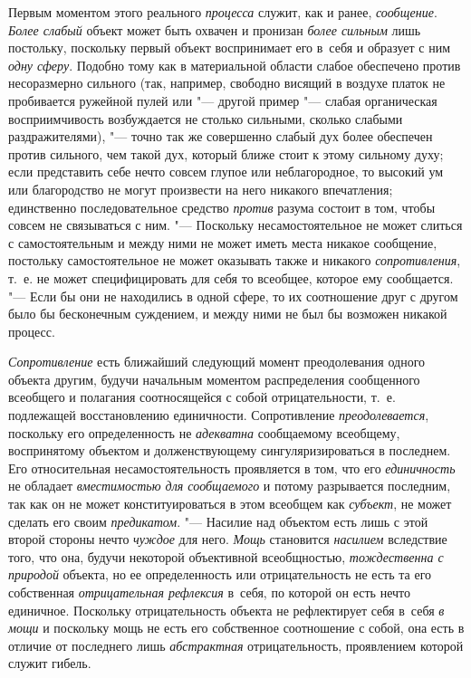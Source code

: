 Первым моментом этого реального
{\em процесса} служит,
как и ранее, {\em сообщение}.
{\em Более слабый} объект
может быть охвачен и пронизан {\em более
сильным} лишь постольку, поскольку первый объект
воспринимает его в~себя и образует с ним
{\em одну сферу}. Подобно
тому как в материальной области слабое обеспечено против несоразмерно
сильного (так, например, свободно висящий в воздухе платок не пробивается
ружейной пулей или "--- другой пример "--- слабая
органическая восприимчивость возбуждается не столько сильными, сколько
слабыми раздражителями), "--- точно так же совершенно слабый
дух более обеспечен против сильного, чем такой дух, который ближе стоит к
этому сильному духу; если представить себе нечто совсем глупое или
неблагородное, то высокий ум или благородство не могут произвести на него
никакого впечатления; единственно последовательное средство
{\em против} разума
состоит в том, чтобы совсем не связываться с ним. "---
Поскольку несамостоятельное не может слиться с
самостоятельным и между ними не может иметь места никакое сообщение,
постольку самостоятельное не может оказывать также и никакого
{\em сопротивления},
т.~е. не может специфицировать для себя то всеобщее, которое
ему сообщается. "--- Если бы они не находились в одной сфере,
то их соотношение друг с другом было бы бесконечным
суждением, и между ними не был бы возможен никакой процесс.

{\em Сопротивление} есть
ближайший следующий момент преодолевания одного объекта другим, будучи
начальным моментом распределения сообщенного всеобщего и полагания
соотносящейся с собой отрицательности, т.~е. подлежащей восстановлению
единичности. Сопротивление
{\em преодолевается},
поскольку его определенность не
{\em адекватна}
сообщаемому всеобщему, воспринятому объектом и
долженствующему сингуляризироваться в последнем. Его относительная
несамостоятельность проявляется в том, что его
{\em единичность} не
обладает {\em вместимостью для
сообщаемого} и потому разрывается последним, так как он не
может конституироваться в этом всеобщем как
{\em субъект}, не может
сделать его своим {\em предикатом}. "---
Насилие над объектом есть лишь с этой второй стороны нечто
{\em чуждое} для него.
{\em Мощь} становится
{\em насилием} вследствие
того, что она, будучи некоторой объективной всеобщностью,
{\em тождественна с природой}
объекта, но ее определенность или отрицательность не есть та
его собственная {\em отрицательная
рефлексия} в~себя, по которой он есть нечто единичное.
Поскольку отрицательность объекта не рефлектирует себя в~себя
{\em в мощи} и поскольку
мощь не есть его собственное соотношение с собой, она есть в отличие от
последнего лишь {\em абстрактная}
отрицательность, проявлением которой служит гибель.

